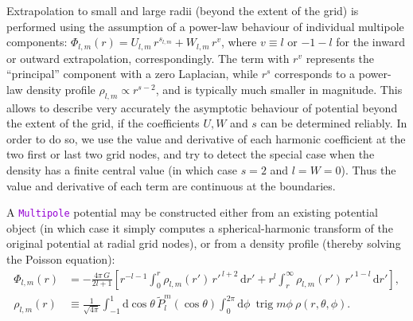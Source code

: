 \documentclass[12pt]{article}
\newcommand{\ttt}[1]{\textcolor{darkviolet}{\texttt{#1}}}
\renewcommand{\d}{\mathrm{d}}
\DeclareMathOperator{\trig}{trig}
\begin{document}
Extrapolation to small and large radii (beyond the extent of the grid) is performed using the assumption of a power-law behaviour of individual multipole components: $\Phi_{l,m}(r) = U_{l,m}\, r^{s_{l,m}} + W_{l,m}\, r^{v}$, where $v\equiv l$ or $-1-l$ for the inward or outward extrapolation, correspondingly. The term with $r^v$ represents the ``principal'' component with a zero Laplacian, while $r^s$ corresponds to a power-law density profile $\rho_{l,m}\propto r^{s-2}$, and is typically much smaller in magnitude. This allows to describe very accurately the asymptotic behaviour of potential beyond the extent of the grid, if the coefficients $U,W$ and $s$ can be determined reliably. In order to do so, we use the value and derivative of each harmonic coefficient at the two first or last two grid nodes, and try to detect the special case when the density has a finite central value (in which case $s=2$ and $l=W=0$). Thus the value and derivative of each term are continuous at the boundaries. 

A \ttt{Multipole} potential may be constructed either from an existing potential object (in which case it simply computes a spherical-harmonic transform of the original potential at radial grid nodes), or from a density profile (thereby solving the Poisson equation):
\begin{align}
\Phi_{l,m}(r) &= -\frac{4\pi\,G}{2l+1} \left[ r^{-l-1} \int_0^r \rho_{l,m}(r')\,{r'}^{\,l+2}\,\d r' + r^l\int_r^\infty \rho_{l,m}(r')\,{r'}^{\,1-l}\,\d r' \right],  \label{eq:SphHarmPoisson} \\
\rho_{l,m}(r) &\equiv \frac{1}{\sqrt{4\pi}} \int_{-1}^1 \d \cos\theta\, \tilde P_l^m(\cos\theta) \int_0^{2\pi}\d \phi\:\trig m\phi\:\rho(r,\theta,\phi) .  \label{eq:SphHarmDensity}
\end{align}
\end{document}
